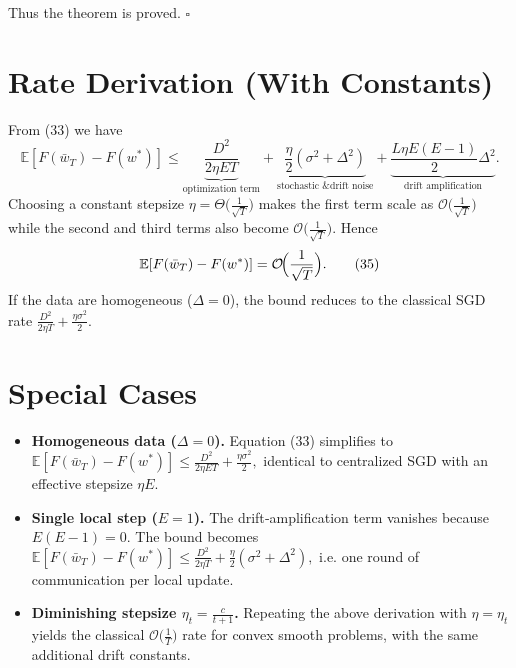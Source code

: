 \documentclass[11pt]{article}
\begin{document}
Thus the theorem is proved.  \hfill\(\square\)

\section*{Rate Derivation (With Constants)}
From (33) we have
\[
\mathbb{E}[F(\bar w_T)-F(w^{*})]
 \le \underbrace{\frac{D^{2}}{2\eta E T}}_{\text{optimization term}}
    +\underbrace{\frac{\eta}{2}(\sigma^{2}+\Delta^{2})}_{\text{stochastic \& drift noise}}
    +\underbrace{\frac{L\eta E(E-1)}{2}\Delta^{2}}_{\text{drift amplification}}.
\tag{34}
\]
Choosing a constant stepsize
\(\displaystyle \eta=\Theta\!\bigl(\tfrac{1}{\sqrt{T}}\bigr)\) makes the first
term scale as \(\mathcal{O}\!\bigl(\tfrac{1}{\sqrt{T}}\bigr)\) while the
second and third terms also become \(\mathcal{O}\!\bigl(\tfrac{1}{\sqrt{T}}\bigr)\).
Hence
\[
\mathbb{E}[F(\bar w_T)-F(w^{*})]=\mathcal{O}\!\Bigl(\frac{1}{\sqrt{T}}\Bigr).
\tag{35}
\]
If the data are homogeneous (\(\Delta=0\)), the bound reduces to the
classical SGD rate \(\frac{D^{2}}{2\eta T}+\frac{\eta\sigma^{2}}{2}\).

\section*{Special Cases}
\begin{itemize}
  \item \textbf{Homogeneous data (\(\Delta=0\)).}  
        Equation (33) simplifies to
        \(\displaystyle 
        \mathbb{E}[F(\bar w_T)-F(w^{*})]
        \le \frac{D^{2}}{2\eta E T}
           +\frac{\eta\sigma^{2}}{2},
        \)
        identical to centralized SGD with an effective stepsize
        \(\eta E\).

  \item \textbf{Single local step (\(E=1\)).}  
        The drift‑amplification term vanishes because
        \(E(E-1)=0\).  The bound becomes
        \(\displaystyle 
        \mathbb{E}[F(\bar w_T)-F(w^{*})]
        \le \frac{D^{2}}{2\eta T}
           +\frac{\eta}{2}(\sigma^{2}+\Delta^{2}),
        \)
        i.e. one round of communication per local update.

  \item \textbf{Diminishing stepsize \(\eta_t=\frac{c}{t+1}\).}  
        Repeating the above derivation with \(\eta=\eta_t\) yields the
        classical \(\mathcal{O}\!\bigl(\frac{1}{T}\bigr)\) rate for convex
        smooth problems, with the same additional drift constants.
\end{itemize}

\end{document}
